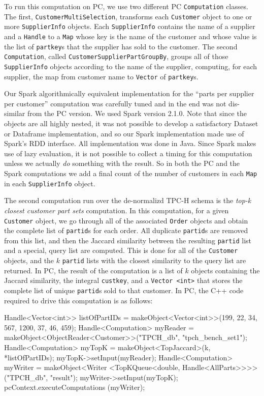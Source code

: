 To run this computation on PC, we use two different PC \texttt{Computation} classes.  The first, 
\texttt{Customer}\-\texttt{MultiSelection}, transforms each 
\texttt{Customer} object to one or more
\texttt{SupplierInfo} objects. Each \texttt{SupplierInfo} contains
the name of a supplier
and a \texttt{Handle} to a \texttt{Map} whose key is the name of the customer and whose value is the list
of \texttt{partkey}s that the supplier has sold to the customer.
The second \texttt{Computation}, called
\texttt{CustomerSupplierPartGroupBy},
groups all of those \texttt{SupplierInfo} objects according to the name of the supplier, computing, for each
supplier, the map from customer name to \texttt{Vector} of \texttt{partkey}s.

Our Spark algorithmically equivalent
implementation for the ``parts per supplier per customer'' computation was carefully tuned and in the
end was not dis-similar from the PC
version.  We used
Spark version
2.1.0.
Note that since the objects are all highly nested, it was not possible to develop a satisfactory
Dataset or Dataframe implementation, and so our Spark implementation made use of Spark's RDD interface.  All
implementation was done in Java.  Since Spark makes use of lazy evaluation, it is not possible to collect a timing
for this computation unless we actually \emph{do} something with the result.  So in both the PC and the Spark computations
we add a final count of the number of customers in each \texttt{Map} in each \texttt{SupplierInfo} object.

The second computation run over the de-normalizd TPC-H schema is the \emph{top-k closest customer part sets} computation.
In this computation, 
for a given
\texttt{Customer} object, we go through all of the associated 
\texttt{Order} objects and obtain the complete list of
\texttt{partid}s for each order.  All duplicate \texttt{partid}s are
removed from this list, and then the Jaccard similarity between the resulting \texttt{partid} list and a special, query
list are computed.  This is done for all of the \texttt{Customer} objects, and the $k$ \texttt{partid} lists with the 
closest similarity to the query list are returned.
In PC,
the result of the computation is a list of $k$ objects containing the Jaccard similarity, the integral \texttt{custkey}, and
a \texttt{Vector <int>} that stores the complete list of unique \texttt{partid}s sold to that customer.
In PC, the C++ code required to drive this computation is as follows:
\begin{code}
Handle<Vector<int>> listOfPartIDs = 
    makeObject<Vector<int>>(199, 22, 34, 567, 1200, 37, 46, 459);
Handle<Computation> myReader = 
    makeObject<ObjectReader<Customer>>("TPCH_db", "tpch_bench_set1");
Handle<Computation> myTopK = makeObject<TopJaccard>(k, *listOfPartIDs);
myTopK->setInput(myReader);
Handle<Computation> myWriter = makeObject<Writer
    <TopKQueue<double, Handle<AllParts>>>>("TPCH_db", "result");
myWriter->setInput(myTopK);
pcContext.executeComputations (myWriter);
\end{code}

